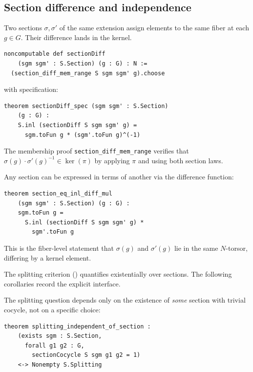 \documentclass[11pt]{article}
\newcommand{\lean}[1]{\texttt{#1}}
\begin{document}
\subsection{Section difference and independence}\label{sec:coboundary}

Two sections $\sigma, \sigma'$ of the same extension assign elements to the same
fiber at each $g \in G$.  Their difference lands in the kernel.

\begin{definition}\label{def:section-diff}
\begin{lstlisting}
noncomputable def sectionDiff
    (sgm sgm' : S.Section) (g : G) : N :=
  (section_diff_mem_range S sgm sgm' g).choose
\end{lstlisting}
with specification:
\begin{lstlisting}
theorem sectionDiff_spec (sgm sgm' : S.Section)
    (g : G) :
    S.inl (sectionDiff S sgm sgm' g) =
      sgm.toFun g * (sgm'.toFun g)^(-1)
\end{lstlisting}
\end{definition}

\noindent
The membership proof \lean{section\_diff\_mem\_range} verifies that
$\sigma(g) \cdot \sigma'(g)^{-1} \in \ker(\pi)$ by applying $\pi$ and using both
section laws.

\begin{theorem}\label{thm:section-relation}
Any section can be expressed in terms of another via the difference function:
\begin{lstlisting}
theorem section_eq_inl_diff_mul
    (sgm sgm' : S.Section) (g : G) :
    sgm.toFun g =
      S.inl (sectionDiff S sgm sgm' g) *
        sgm'.toFun g
\end{lstlisting}
\end{theorem}

\noindent
This is the fiber-level statement that $\sigma(g)$ and $\sigma'(g)$ lie in the same
$N$-torsor, differing by a kernel element.

The splitting criterion () quantifies existentially over
sections.  The following corollaries record the explicit interface.

\begin{theorem}\label{thm:independence}
The splitting question depends only on the existence of \emph{some} section with
trivial cocycle, not on a specific choice:
\begin{lstlisting}
theorem splitting_independent_of_section :
    (exists sgm : S.Section,
      forall g1 g2 : G,
        sectionCocycle S sgm g1 g2 = 1)
    <-> Nonempty S.Splitting
\end{lstlisting}
\end{theorem}
\end{document}
